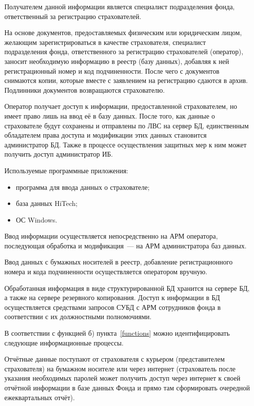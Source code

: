 Получателем данной информации является специалист подразделения фонда,
ответственный за регистрацию страхователей.

\point На основе документов, предоставляемых физическим или
юридическим лицом, желающим зарегистрироваться в качестве
страхователя, специалист подразделения фонда, ответственного за
регистрацию страхователей (оператор), заносит необходимую информацию в
реестр (базу данных), добавляя к ней регистрационный номер и код
подчиненности. После чего с документов снимаются копии, которые вместе
с заявлением на регистрацию сдаются в архив. Подлинники документов
возвращаются страхователю.

\point Оператор получает доступ к информации, предоставленной
страхователем, но имеет право лишь на ввод её в базу данных. После
того, как данные о страхователе будут сохранены и отправлены по ЛВС на
сервер БД, единственным обладателем права доступа и модификации этих
данных становится администратор БД. Также в процессе осуществления
защитных мер к ним может получить доступ администратор ИБ.

\point Используемые программные приложения:

\begin{itemize}
\item программа для ввода данных о страхователе;
\item база данных HiTech;
\item ОС Windows.
\end{itemize}

\point Ввод информации осуществляется непосредственно на АРМ оператора,
последующая обработка и модификация~--- на АРМ администратора баз
данных.

Ввод данных с бумажных носителей в реестр, добавление регистрационного
номера и кода подчиненности осуществляется оператором вручную.

\point Обработанная информация в виде структурированной БД хранится на
сервере БД, а также на сервере резервного копирования. Доступ к
информации в БД осуществляется средствами запросов СУБД с АРМ
сотрудников фонда в соответствии с их должностными полномочиями.

В соответствии с функцией б) пункта~\ref{functions} можно
идентифицировать следующие информационные процессы.

\point Отчётные данные поступают от страхователя с курьером (представителем
страхователя) на бумажном носителе или через интернет (страхователь
после указания необходимых паролей может получить доступ через
интернет к своей отчётной информации в базе данных Фонда и прямо там
сформировать очередной ежеквартальных отчёт).

